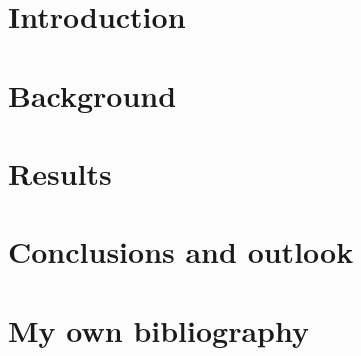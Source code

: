 \documentclass[a4paper, 12pt]{article}
\begin{document}

\section{Introduction}


\newpage

\section{Background}


\newpage
\section{Results}

\newpage
\section{Conclusions and outlook}


\newpage
\section*{My own bibliography}


\newpage


\newpage

\appendix
\end{document}
